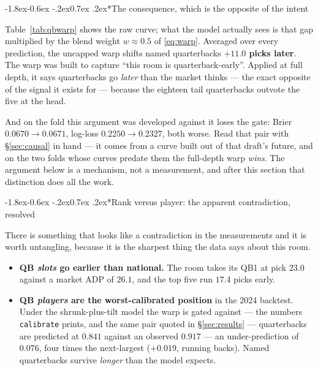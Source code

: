 \documentclass[10pt,a4paper]{article}
\makeatletter
\theoremstyle{plain}
\theoremstyle{definition}
\theoremstyle{remark}
\newcommand{\code}[1]{\texttt{\small #1}}
\renewcommand\subsubsection{\@startsection{subsubsection}{3}{\z@}%
  {-1.8ex\@plus -0.6ex \@minus -.2ex}{0.7ex \@plus .2ex}{\normalfont\normalsize\bfseries}}
\makeatother
\begin{document}
\subsubsection*{The consequence, which is the opposite of the intent}

Table~\ref{tab:qbwarp} shows the raw curve; what the model actually sees is that gap
multiplied by the blend weight $w \approx 0.5$ of \eqref{eq:warp}. Averaged over every
prediction, the uncapped warp shifts named quarterbacks \textbf{$+11.0$ picks later}. The warp was built to capture ``this room is
quarterback-early''. Applied at full depth, it says quarterbacks go \emph{later} than the
market thinks --- the exact opposite of the signal it exists for --- because the eighteen
tail quarterbacks outvote the five at the head.

And on the fold this argument was developed against it loses the gate: Brier
$0.0670 \to 0.0671$, log-loss $0.2250 \to 0.2327$, both worse. Read that pair with
\S\ref{sec:causal} in hand --- it comes from a curve built out of that draft's future, and
on the two folds whose curves predate them the full-depth warp \emph{wins}. The argument
below is a mechanism, not a measurement, and after this section that distinction does all
the work.

\subsubsection*{Rank versus player: the apparent contradiction, resolved}

There is something that looks like a contradiction in the measurements and it is worth
untangling, because it is the sharpest thing the data says about this room.

\begin{itemize}
\item \textbf{QB \emph{slots} go earlier than national.} The room takes its QB1 at pick
$23.0$ against a market ADP of $26.1$, and the top five run $17.4$ picks early.
\item \textbf{QB \emph{players} are the worst-calibrated position} in the 2024 backtest.
Under the shrunk-plus-tilt model the warp is gated against --- the numbers
\code{calibrate} prints, and the same pair quoted in \S\ref{sec:results} --- quarterbacks
are predicted at $0.841$ against an observed $0.917$ --- an under-prediction of $0.076$,
four times the next-largest ($+0.019$, running backs). Named quarterbacks survive
\emph{longer} than the model expects.
\end{itemize}
\end{document}
